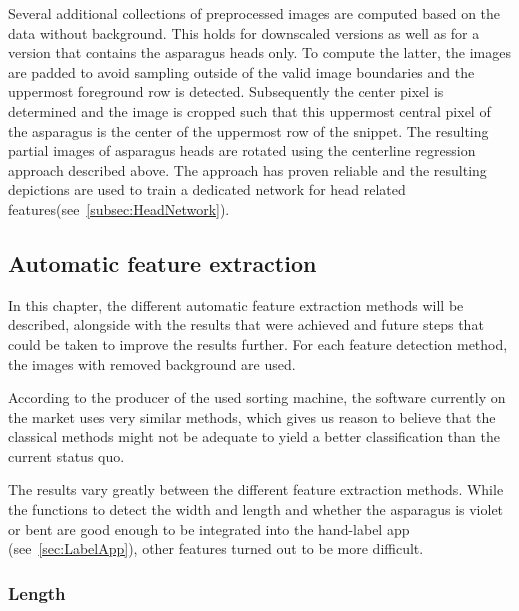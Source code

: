 Several additional collections of preprocessed images are computed based on the data without background. This holds for downscaled versions as well as for a version that contains the asparagus heads only. To compute the latter, the images are padded to avoid sampling outside of the valid image boundaries and the uppermost foreground row is detected. Subsequently the center pixel is determined and the image is cropped such that this uppermost central pixel of the asparagus is the center of the uppermost row of the snippet. The resulting partial images of asparagus heads are rotated using the centerline regression approach described above. The approach has proven reliable and the resulting depictions are used to train a dedicated network for head related features(see~\autoref{subsec:HeadNetwork}).


\subsection{Automatic feature extraction}
\label{sec:AutomaticFeatureExtraction}

In this chapter, the different automatic feature extraction methods will be described, alongside with the results that were achieved and future steps that could be taken to improve the results further. For each feature detection method, the images with removed background are used. 

\bigskip
According to the producer of the used sorting machine, the software currently on the market uses very similar methods, which gives us reason to believe that the classical methods might not be adequate to yield a better classification than the current status quo.

The results vary greatly between the different feature extraction methods. While the functions to detect the width and length and whether the asparagus is violet or bent are good enough to be integrated into the hand-label app (see~\autoref{sec:LabelApp}), other features turned out to be more difficult.


\subsubsection{Length}
\label{subsec:Length}

